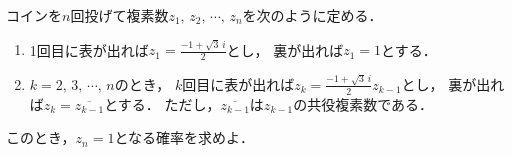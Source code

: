 \documentclass[../../main.tex]{subfiles}
\begin{document}
コインを$n$回投げて複素数$z_1, \, z_2, \, \cdots, \, z_n$を次のように定める．
\begin{enumerate}
  \item1回目に表が出れば$\displaystyle z_1=\frac{-1+\sqrt3 \, i}{2}$とし，
    裏が出れば$z_1=1$とする．
  \item$k=2, \, 3, \, \cdots, \, n$のとき，
    $k$回目に表が出れば$\displaystyle z_k=\frac{-1+\sqrt3 \, i}{2}z_{k-1}$とし，
    裏が出れば$z_k=\overline{z_{k-1}}$とする．
    ただし，$\overline{z_{k-1}}$は$z_{k-1}$の共役複素数である．
\end{enumerate}
このとき，$z_n=1$となる確率を求めよ．
\end{document}

